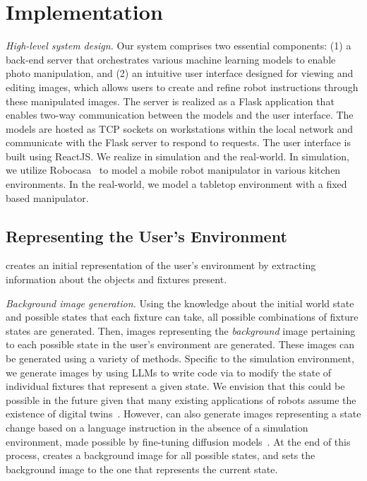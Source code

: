 \section{Implementation}
\emph{High-level system design.} Our system comprises two essential components: (1) a back-end server that orchestrates various machine learning models to enable photo manipulation, and (2) an intuitive user interface designed for viewing and editing images, which allows users to create and refine robot instructions through these manipulated images. The server is realized as a Flask application that enables two-way communication between the models and the user interface. The models are hosted as TCP sockets on workstations within the local network and communicate with the Flask server to respond to requests. The user interface is built using ReactJS. We realize \projname in simulation and the real-world. In simulation, we utilize Robocasa~\cite{nasiriany2024robocasa} to model a mobile robot manipulator in various kitchen environments. In the real-world, we model a tabletop environment with a fixed based manipulator.


\subsection{Representing the User's Environment} 
\projname creates an initial representation of the user's environment by extracting information about the objects and fixtures present.

\emph{Background image generation.} Using the knowledge about the initial world state and possible states that each fixture can take, all possible combinations of fixture states are generated. Then, 
images representing the \textit{background} image pertaining to each possible state in the user's environment are generated. These images can be generated using a variety of methods. Specific to the simulation environment, we generate images by using LLMs to write code via to modify the state of individual fixtures that represent a given state. We envision that this could be possible in the future given that many existing applications of robots assume the existence of digital twins~. However, \projname can also generate images representing a state change based on a language instruction in the absence of a simulation environment, made possible by fine-tuning diffusion models~\cite{brooks2023instructpix2pix, black2023zero}. At the end of this process, \projname creates a background image for all possible states, and sets the background image to the one that represents the current state.

